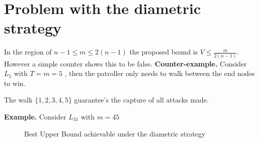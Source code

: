 \documentclass[11pt]{beamer}
\begin{document}
\section[]{Problem with the diametric strategy}
\hypertarget{Problem with diametric strategy}{}
\begin{frame}{\insertsection}

In the region of $n-1 \leq m \leq 2(n-1)$ the proposed bound is $V \leq \frac{m}{2(n-1)}$. However a simple counter shows this to be false.
\newline
\newline
\textbf{Counter-example.}
Consider $L_{5}$ with $T=m=5$ , then the patroller only needs to walk between the end nodes to win.
\begin{center}
\end{center}
The walk $\{ 1,2,3,4,5 \}$ guarantee's the capture of all attacks made.

\end{frame}

\begin{frame}{\insertsection}

\textbf{Example.}
Consider $L_{31}$ with $m=45$

\begin{figure}
\resizebox{0.95\linewidth}{!}{
}
\caption{Best Upper Bound achievable under the diametric strategy}
\end{figure}

\end{frame}
\end{document}
